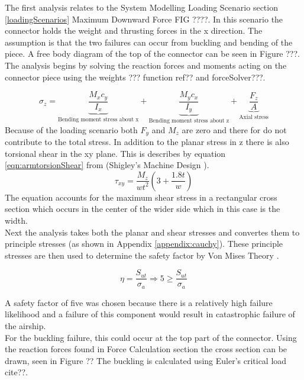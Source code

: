 \documentclass[../main.tex]{subfiles}
\begin{document}
The first analysis relates to the System Modelling Loading Scenario section \ref{loadingScenarios} Maximum Downward Force FIG ????. In this scenario the connector holds the weight and thrusting forces in the x direction. The assumption is that the two failures can occur from buckling and bending of the piece. A free body diagram of the top of the connector can be seen in Figure ???. The analysis begins by solving the reaction forces and moments acting on the connector piece using the weights ??? function ref?? and forceSolver???. 

\begin{equation}
\label{eqn:connectorztress}
\sigma_{z}=  \underbrace{\frac{M_{x}c_y}{I_x}}_\text{Bending moment stress about x} + \underbrace{\frac{M_{y}c_x}{I_y}}_\text{Bending moment stress about z} + \underbrace{\frac{F_z}{A}}_\text{Axial stress} 
\end{equation}
Because of the loading scenario both $F_y$ and $M_z$ are zero and there for do not contribute to the total stress. In addition to the planar stress in z there is also torsional shear in the xy plane. This is describes by equation \ref{eqn:armtorsionShear} from {(Shigley's Machine Design \cite[102]{shigley})}.
\begin{equation} \label{eqn:armtorsionShear}
\tau_{xy} = \dfrac{M_{z}}{wt^2}(3+\frac{1.8t}{w})
\end{equation}
The equation accounts for the maximum shear stress in a rectangular cross section which occurs in the center of the wider side which in this case is the width. \\ 

Next the analysis takes both the planar and shear stresses and convertes them to principle stresses (as shown in Appendix \ref{appendix:cauchy}). These principle stresses are then used to determine the safety factor by Von Mises Theory \cite[221]{shigley}.

\begin{equation}
\eta = \dfrac{S_{ut}}{\sigma _a} \Rightarrow 5 \geq \dfrac{S_{ut}}{\sigma _a}
\end{equation}

A safety factor of five was chosen because there is a relatively high failure likelihood and a failure of this component would result in catastrophic failure of the airship.\\

For the buckling failure, this could occur at the top part of the connector. Using the reaction forces found in Force Calculation section the cross section can be drawn, seen in Figure ?? The buckling is calculated using Euler's critical load cite??. 
\end{document}
